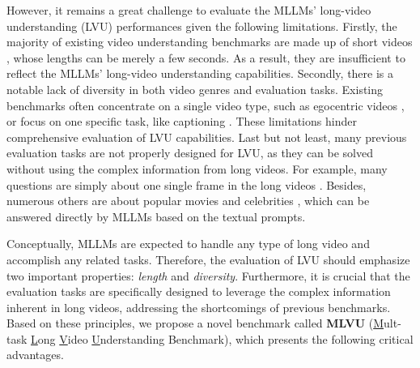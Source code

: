 However, it remains a great challenge to evaluate the MLLMs' long-video understanding (LVU) performances given the following limitations. Firstly, the majority of existing video understanding benchmarks are made up of short videos \cite{msrvtt2016,mvbench2023,seedbench2023,videobench2023,cvrr-2024}, whose lengths can be merely a few seconds. As a result, they are insufficient to reflect the MLLMs' long-video understanding capabilities. Secondly, there is a notable lack of diversity in both video genres and evaluation tasks. Existing benchmarks often concentrate on a single video type, such as egocentric videos \cite{ego4d2022, egoschema2023}, or focus on one specific task, like captioning \cite{msrvtt2016}. These limitations hinder comprehensive evaluation of LVU capabilities. Last but not least, many previous evaluation tasks are not properly designed for LVU, as they can be solved without using the complex information from long videos. For example, many questions are simply about one single frame in the long videos \cite{moviechat2023, zhang2024longva}. Besides, numerous others are about popular movies and celebrities \cite{llama-vid2023, videomme2024}, which can be answered directly by MLLMs based on the textual prompts. 

Conceptually, MLLMs are expected to handle any type of long video and accomplish any related tasks. Therefore, the evaluation of LVU should emphasize two important properties: \textit{length} and \textit{diversity}. Furthermore, it is crucial that the evaluation tasks are specifically designed to leverage the complex information inherent in long videos, addressing the shortcomings of previous benchmarks. Based on these principles, we propose a novel benchmark called \textbf{MLVU} (\uline{M}ult-task \uline{L}ong \uline{V}ideo \uline{U}nderstanding Benchmark), which presents the following critical advantages.

